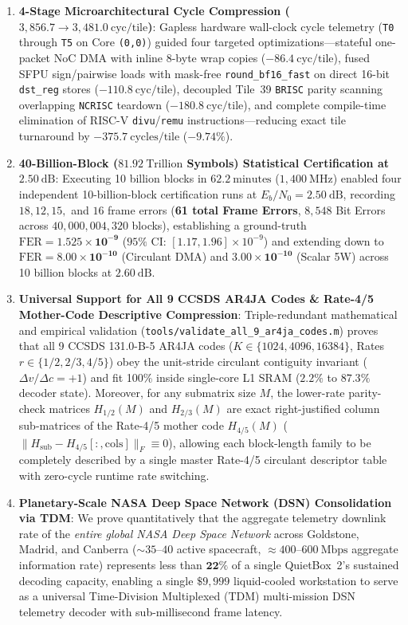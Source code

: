 \documentclass[10pt]{article}
\begin{document}
\begin{enumerate}[leftmargin=1.8em, itemsep=3pt]
    \item \textbf{4-Stage Microarchitectural Cycle Compression ($3,856.7 \to 3,481.0\ \mathrm{cyc/tile}$)}: Gapless hardware wall-clock cycle telemetry (\texttt{T0} through \texttt{T5} on Core \texttt{(0,0)}) guided four targeted optimizations---stateful one-packet NoC DMA with inline 8-byte wrap copies ($-86.4\ \mathrm{cyc/tile}$), fused SFPU sign/pairwise loads with mask-free \texttt{round\_bf16\_fast} on direct 16-bit \texttt{dst\_reg} stores ($-110.8\ \mathrm{cyc/tile}$), decoupled Tile~39 \texttt{BRISC} parity scanning overlapping \texttt{NCRISC} teardown ($-180.8\ \mathrm{cyc/tile}$), and complete compile-time elimination of RISC-V \texttt{divu}/\texttt{remu} instructions---reducing exact tile turnaround by $\mathbf{-375.7\ \mathrm{cycles/tile}}$ ($\mathbf{-9.74\%}$).
    \item \textbf{40-Billion-Block ($81.92\ \mathrm{Trillion}$ Symbols) Statistical Certification at $2.50\ \mathrm{dB}$}: Executing 10 billion blocks in $\mathbf{62.2\ \mathrm{minutes}}$ ($1,400\ \mathrm{MHz}$) enabled four independent 10-billion-block certification runs at $E_b/N_0 = 2.50\ \mathrm{dB}$, recording $18, 12, 15,$ and $16$ frame errors (\textbf{61 total Frame Errors}, $8,548$ Bit Errors across $40,000,004,320$ blocks), establishing a ground-truth $\mathrm{FER} = \mathbf{1.525 \times 10^{-9}}$ ($95\%$ CI: $[1.17, 1.96] \times 10^{-9}$) and extending down to $\mathrm{FER} = \mathbf{8.00 \times 10^{-10}}$ (Circulant DMA) and $\mathbf{3.00 \times 10^{-10}}$ (Scalar 5W) across 10 billion blocks at $2.60\ \mathrm{dB}$.
    \item \textbf{Universal Support for All 9 CCSDS AR4JA Codes \& Rate-4/5 Mother-Code Descriptive Compression}: Triple-redundant mathematical and empirical validation (\texttt{tools/validate\_all\_9\_ar4ja\_codes.m}) proves that all 9 CCSDS 131.0-B-5 AR4JA codes ($K \in \{1024, 4096, 16384\}$, Rates $r \in \{1/2, 2/3, 4/5\}$) obey the unit-stride circulant contiguity invariant ($\Delta v / \Delta c = +1$) and fit 100\% inside single-core L1 SRAM ($2.2\%$ to $87.3\%$ decoder state). Moreover, for any submatrix size $M$, the lower-rate parity-check matrices $H_{1/2}(M)$ and $H_{2/3}(M)$ are exact right-justified column sub-matrices of the Rate-4/5 mother code $H_{4/5}(M)$ ($\| H_{\mathrm{sub}} - H_{4/5}[:, \mathrm{cols}] \|_F \equiv 0$), allowing each block-length family to be completely described by a single master Rate-4/5 circulant descriptor table with zero-cycle runtime rate switching.
    \item \textbf{Planetary-Scale NASA Deep Space Network (DSN) Consolidation via TDM}: We prove quantitatively that the aggregate telemetry downlink rate of the \emph{entire global NASA Deep Space Network} across Goldstone, Madrid, and Canberra ($\sim 35\text{--}40$ active spacecraft, $\approx 400\text{--}600\ \mathrm{Mbps}$ aggregate information rate) represents less than $\mathbf{22\%}$ of a single QuietBox~2's sustained decoding capacity, enabling a single $\$9,999$ liquid-cooled workstation to serve as a universal Time-Division Multiplexed (TDM) multi-mission DSN telemetry decoder with sub-millisecond frame latency.
\end{enumerate}
\end{document}

